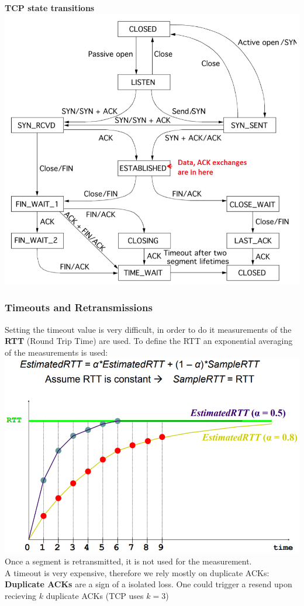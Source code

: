 \documentclass[a4paper, fontsize=8pt, landscape, DIV=1]{scrartcl}
\begin{document}
\begin{multicols*}{4}
		\textbf{TCP state transitions}\\
		\includegraphics[width=\columnwidth]{images/Transport_Layer/state_transitions.png}
		
		\subsubsection{Timeouts and Retransmissions}	
		Setting the timeout value is very difficult, in order to do it measurements of the \textbf{RTT} (Round Trip Time) are used.
		To define the RTT an exponential averaging of the measurements is used:
		\includegraphics[width=\columnwidth]{images/Transport_Layer/RTT_calc.png} 
		Once a segment is retransmitted, it is not used for the measurement.\\
		A timeout is very expensive, therefore we rely mostly on duplicate ACKs:\\
		\textbf{Duplicate ACKs} are a sign of a isolated loss. One could trigger a resend upon recieving $k$ duplicate ACKs (TCP uses $k = 3$)
		

\end{multicols*}
\end{document}

